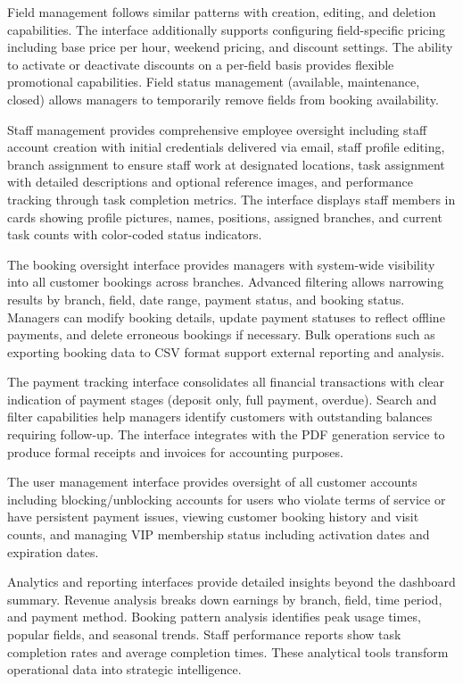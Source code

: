 Field management follows similar patterns with creation, editing, and deletion capabilities. The interface additionally supports configuring field-specific pricing including base price per hour, weekend pricing, and discount settings. The ability to activate or deactivate discounts on a per-field basis provides flexible promotional capabilities. Field status management (available, maintenance, closed) allows managers to temporarily remove fields from booking availability.

Staff management provides comprehensive employee oversight including staff account creation with initial credentials delivered via email, staff profile editing, branch assignment to ensure staff work at designated locations, task assignment with detailed descriptions and optional reference images, and performance tracking through task completion metrics. The interface displays staff members in cards showing profile pictures, names, positions, assigned branches, and current task counts with color-coded status indicators.

The booking oversight interface provides managers with system-wide visibility into all customer bookings across branches. Advanced filtering allows narrowing results by branch, field, date range, payment status, and booking status. Managers can modify booking details, update payment statuses to reflect offline payments, and delete erroneous bookings if necessary. Bulk operations such as exporting booking data to CSV format support external reporting and analysis.

The payment tracking interface consolidates all financial transactions with clear indication of payment stages (deposit only, full payment, overdue). Search and filter capabilities help managers identify customers with outstanding balances requiring follow-up. The interface integrates with the PDF generation service to produce formal receipts and invoices for accounting purposes.

The user management interface provides oversight of all customer accounts including blocking/unblocking accounts for users who violate terms of service or have persistent payment issues, viewing customer booking history and visit counts, and managing VIP membership status including activation dates and expiration dates.

Analytics and reporting interfaces provide detailed insights beyond the dashboard summary. Revenue analysis breaks down earnings by branch, field, time period, and payment method. Booking pattern analysis identifies peak usage times, popular fields, and seasonal trends. Staff performance reports show task completion rates and average completion times. These analytical tools transform operational data into strategic intelligence.

